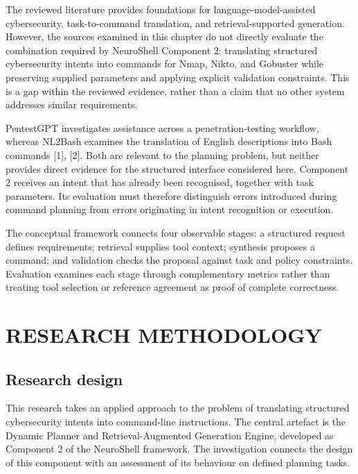 \documentclass[
]{article}
\begin{document}
The reviewed literature provides foundations for language-model-assisted
cybersecurity, task-to-command translation, and retrieval-supported
generation. However, the sources examined in this chapter do not
directly evaluate the combination required by NeuroShell Component 2:
translating structured cybersecurity intents into commands for Nmap,
Nikto, and Gobuster while preserving supplied parameters and applying
explicit validation constraints. This is a gap within the reviewed
evidence, rather than a claim that no other system addresses similar
requirements.

PentestGPT investigates assistance across a penetration-testing
workflow, whereas NL2Bash examines the translation of English
descriptions into Bash commands {[}1{]}, {[}2{]}. Both are relevant to
the planning problem, but neither provides direct evidence for the
structured interface considered here. Component 2 receives an intent
that has already been recognised, together with task parameters. Its
evaluation must therefore distinguish errors introduced during command
planning from errors originating in intent recognition or execution.

The conceptual framework connects four observable stages: a structured
request defines requirements; retrieval supplies tool context; synthesis
proposes a command; and validation checks the proposal against task and
policy constraints. Evaluation examines each stage through complementary
metrics rather than treating tool selection or reference agreement as
proof of complete correctness.

\hypertarget{research-methodology}{%
\section{RESEARCH METHODOLOGY}\label{research-methodology}}

\hypertarget{research-design}{%
\subsection{Research design}\label{research-design}}

This research takes an applied approach to the problem of translating
structured cybersecurity intents into command-line instructions. The
central artefact is the Dynamic Planner and Retrieval-Augmented
Generation Engine, developed as Component 2 of the NeuroShell framework.
The investigation connects the design of this component with an
assessment of its behaviour on defined planning tasks.
\end{document}
